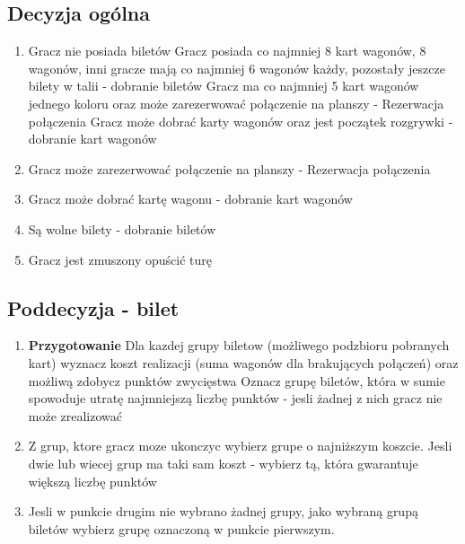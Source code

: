\documentclass[12pt, oneside]{report}
\begin{document}
\subsection{Decyzja ogólna}
\begin{enumerate}
	\item Gracz nie posiada biletów
	 Gracz posiada co najmniej 8 kart wagonów, 8 wagonów, inni gracze mają co najmniej 6 wagonów każdy, pozostały jeszcze bilety w talii - dobranie biletów
	 Gracz ma co najmniej 5 kart wagonów jednego koloru oraz może zarezerwować połączenie na planszy - Rezerwacja połączenia
	 Gracz może dobrać karty wagonów oraz jest początek rozgrywki - dobranie kart wagonów
	\item Gracz może zarezerwować połączenie na planszy - Rezerwacja połączenia
	\item Gracz może dobrać kartę wagonu - dobranie kart wagonów
	\item Są wolne bilety - dobranie biletów
	\item Gracz jest zmuszony opuścić turę
\end{enumerate}
\subsection{Poddecyzja - bilet}
\begin{enumerate}
	\item \textbf{Przygotowanie} Dla kazdej grupy biletow (możliwego podzbioru pobranych kart) wyznacz koszt realizacji (suma wagonów dla brakujących połączeń) oraz możliwą zdobycz punktów zwycięstwa
	\subitem Oznacz grupę biletów, która w sumie spowoduje utratę najmniejszą liczbę punktów - jesli żadnej z nich gracz nie może zrealizować
	\item Z grup, ktore gracz moze ukonczyc wybierz grupe o najniższym koszcie. Jesli dwie lub wiecej grup ma taki sam koszt - wybierz tą, która gwarantuje większą liczbę punktów
	\item Jesli w punkcie drugim nie wybrano żadnej grupy, jako wybraną grupą biletów wybierz grupę oznaczoną w punkcie pierwszym.
\end{enumerate}
\end{document}
